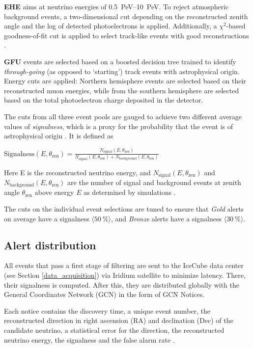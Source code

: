 \documentclass[
    a4paper, %
    fontsize=10pt, %
    twoside=false, %
    numbers=noenddot, %
    fontmethod=tex,
]{kaobook}
\begin{document}
\textbf{EHE} aims at neutrino energies of \SIrange{0.5}{10}{\peta\eV}. To reject atmospheric background events, a two-dimensional cut depending on the reconstructed zenith angle and the log of detected photoelectrons is applied. Additionally, a $\chi^2$-based goodness-of-fit cut is applied to select track-like events with good reconstructions \cite{Abbasi2023}.

\textbf{GFU} events are selected based on a boosted decision tree trained to identify \textit{through-going} (as opposed to `starting') track events with astrophysical origin. Energy cuts are applied: Northern hemisphere events are selected based on their reconstructed muon energies, while from the southern hemisphere are selected based on the total photoelectron charge deposited in the detector.

The cuts from all three event pools are gauged to achieve two different average values of \textit{signalness}, which is a proxy for the probability that the event is of astrophysical origin \cite{Abbasi2023}. It is defined as
\begin{definition}\label{signalness_def}
$\text{Signalness}(E,\theta_\text{zen}) = \frac{N_\text{signal}(E,\theta_\text{zen})}{N_\text{signal}(E,\theta_\text{zen})+N_\text{background}(E,\theta_\text{zen})}$
\end{definition}
Here E is the reconstructed neutrino energy, and $N_\text{signal}(E,\theta_\text{zen})$ and $N_\text{background}(E,\theta_\text{zen})$ are the number of signal and background events at zenith angle $\theta_\text{zen}$ above energy $E$ as determined by simulations \cite{Abbasi2023}.

The cuts on the individual event selections are tuned to ensure that \textit{Gold} alerts on average have a signalness $\langle \SI{50}{\percent} \rangle$, and \textit{Bronze} alerts have a signalness $\langle \SI{30}{\percent} \rangle$.

\subsection{Alert distribution} \label{ic_alerts}
All events that pass a first stage of filtering are sent to the IceCube data center (see Section \ref{data_acquisition}) via Iridium satellite to minimize latency. There, their signalness is computed. After this, they are distributed globally with the General Coordinates Network (GCN) in the form of GCN Notices.

Each notice contains the discovery time, a unique event number, the reconstructed direction in right ascension (RA) and declination (Dec) of the candidate neutrino, a statistical error for the direction, the reconstructed neutrino energy, the signalness and the false alarm rate \cite{Blaufuss2019}.
\end{document}
